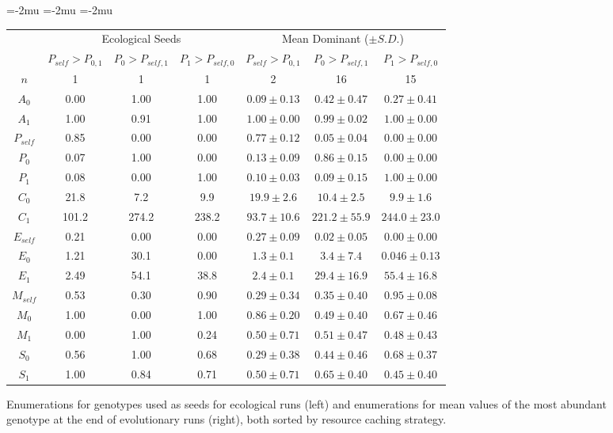 \begin{figure}[t]

\begin{center}
\setlength\tabcolsep{1.5pt} %
\medmuskip=-2mu
\thinmuskip=-2mu
\thickmuskip=-2mu
\nulldelimiterspace=-1pt
\scriptspace=0pt
\begin{tabular}{ | c || c c c | c c c | }
  \multicolumn{1}{c}{} & \multicolumn{3}{c}{Ecological Seeds} & \multicolumn{3}{c}{Mean Dominant ($\pm S.D.$)} \\
 \cline{2-7}
  \multicolumn{1}{c|}{} & \tiny{$P_{self} > P_{0,1}$} & \tiny{$P_0 > P_{self,1}$} & \tiny{$P_1 > P_{self,0}$} & \tiny{$P_{self} > P_{0,1}$} & \tiny{$P_0 > P_{self,1}$} & \tiny{$P_1 > P_{self,0}$}  \\
 \hline
 $n$ & 1 & 1 & 1 & 2 & 16 & 15  \\
 \hhline{|=||===|===|}
 $A_0$ & 0.00 & 1.00 & 1.00 & $0.09 \pm 0.13$ & $0.42 \pm 0.47$ & $0.27 \pm 0.41$ \\
 $A_1$ & 1.00 & 0.91 & 1.00 & $1.00 \pm  0.00$ & $0.99 \pm 0.02$ & $1.00 \pm 0.00$ \\
 \hline
 $P_{self}$ & 0.85 & 0.00 & 0.00 & $0.77 \pm 0.12$ & $0.05 \pm 0.04$ & $0.00 \pm 0.00$ \\
 $P_0$ & 0.07 & 1.00 & 0.00 & $0.13 \pm 0.09$ & $0.86 \pm 0.15$ & $0.00 \pm 0.00$ \\
 $P_1$ & 0.08 & 0.00 & 1.00 & $0.10 \pm 0.03$ & $0.09 \pm 0.15$ & $1.00 \pm 0.00$ \\
 \hline
 $C_0$ & 21.8 & 7.2 & 9.9 & $19.9 \pm 2.6$ & $10.4 \pm 2.5$ & $9.9 \pm 1.6$ \\
 $C_1$ & 101.2 & 274.2 & 238.2 & $93.7 \pm 10.6$ & $221.2 \pm 55.9$ & $244.0 \pm 23.0 $ \\
 \hline
 $E_{self}$ & 0.21 & 0.00 & 0.00 & $0.27 \pm 0.09$ & $0.02 \pm 0.05$ & $0.00 \pm 0.00$ \\
 $E_0$ & 1.21 & 30.1 & 0.00 & $1.3 \pm 0.1$ & $3.4 \pm 7.4$ & $0.046 \pm 0.13$ \\
 $E_1$ & 2.49 & 54.1 & 38.8 & $2.4 \pm 0.1$ & $29.4 \pm 16.9$ & $55.4 \pm 16.8$ \\
 \hline
 $M_{self}$ & 0.53 & 0.30 & 0.90 & $0.29 \pm 0.34$ & $0.35 \pm 0.40$ & $0.95 \pm 0.08$ \\
 $M_0$ & 1.00 & 0.00 & 1.00 & $0.86 \pm 0.20$ & $0.49 \pm 0.40$ & $0.67 \pm 0.46$ \\
 $M_1$ & 0.00 & 1.00 & 0.24 & $0.50 \pm 0.71$ & $0.51 \pm 0.47$ & $0.48 \pm 0.43$ \\
 \hline
 $S_0$ & 0.56 & 1.00 & 0.68 & $0.29 \pm 0.38$ & $0.44 \pm 0.46$ & $0.68 \pm 0.37$ \\
 $S_1$ & 1.00 & 0.84 & 0.71 & $0.50 \pm 0.71$ & $0.65 \pm 0.40$ & $0.45 \pm 0.40$ \\
 \hline
\end{tabular}
\end{center}
\caption{
Enumerations for genotypes used as seeds for ecological runs (left) and enumerations for mean values of the most abundant genotype at the end of evolutionary runs (right), both sorted by resource caching strategy.
}
\label{fig:genotypes}
\end{figure}
